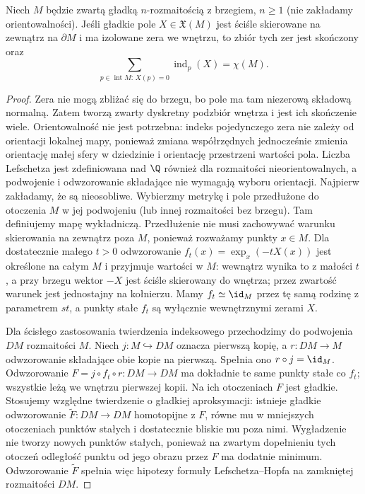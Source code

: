 \begin{twierdzenie}
\label{thm:PH-boundary-v11}
Niech $M$ będzie zwartą gładką
$n$-rozmaitością z brzegiem, $n\ge1$
(nie zakładamy orientowalności).
Jeśli gładkie pole $X\in\mathfrak X(M)$ jest ściśle skierowane
na zewnątrz na $\partial M$ i ma izolowane zera we wnętrzu,
to zbiór tych zer jest skończony oraz
\[
\sum_{p\in\operatorname{int}M:\,X(p)=0}\operatorname{ind}_p(X)=\chi(M).
\]
\end{twierdzenie}
\begin{proof}
Zera nie mogą zbliżać się do brzegu, bo pole ma tam
niezerową składową normalną. Zatem tworzą zwarty dyskretny
podzbiór wnętrza i jest ich skończenie wiele.
Orientowalność nie jest potrzebna: indeks pojedynczego
zera nie zależy od orientacji lokalnej mapy, ponieważ
zmiana współrzędnych jednocześnie zmienia orientację
małej sfery w dziedzinie i orientację przestrzeni
wartości pola. Liczba Lefschetza jest zdefiniowana
nad $\Q$ również dla rozmaitości nieorientowalnych,
a podwojenie i odwzorowanie składające nie wymagają
wyboru orientacji.
Najpierw zakładamy, że są nieosobliwe.
Wybierzmy metrykę i pole przedłużone do otoczenia
$M$ w jej podwojeniu (lub innej rozmaitości bez brzegu).
Tam definiujemy mapę wykładniczą. Przedłużenie nie
musi zachowywać warunku skierowania na zewnątrz
poza $M$, ponieważ rozważamy punkty $x\in M$.
Dla dostatecznie małego $t>0$ odwzorowanie
$f_t(x)=\exp_x(-tX(x))$ jest określone na całym $M$
i przyjmuje wartości w $M$: wewnątrz wynika to z małości
$t$, a przy brzegu wektor $-X$ jest ściśle skierowany
do wnętrza; przez zwartość warunek jest jednostajny
na kołnierzu. Mamy $f_t\simeq\id_M$ przez tę samą
rodzinę z parametrem $st$, a punkty stałe $f_t$ są
wyłącznie wewnętrznymi zerami $X$.

Dla ścisłego zastosowania twierdzenia indeksowego
przechodzimy do podwojenia $DM$ rozmaitości $M$.
Niech $j:M\hookrightarrow DM$ oznacza pierwszą kopię,
a $r:DM\to M$ odwzorowanie składające obie kopie
na pierwszą. Spełnia ono $r\circ j=\id_M$.
Odwzorowanie $F=j\circ f_t\circ r:DM\to DM$ ma dokładnie
te same punkty stałe co $f_t$; wszystkie leżą we wnętrzu
pierwszej kopii. Na ich otoczeniach $F$ jest gładkie.
Stosujemy względne twierdzenie o gładkiej aproksymacji:
istnieje gładkie odwzorowanie $\widetilde F:DM\to DM$
homotopijne z $F$, równe mu w mniejszych otoczeniach
punktów stałych i dostatecznie bliskie mu poza nimi.
Wygładzenie nie tworzy nowych punktów stałych, ponieważ
na zwartym dopełnieniu tych otoczeń odległość punktu
od jego obrazu przez $F$ ma dodatnie minimum.
Odwzorowanie $\widetilde F$ spełnia więc hipotezy
formuły Lefschetza--Hopfa na zamkniętej rozmaitości $DM$.


\end{proof}
